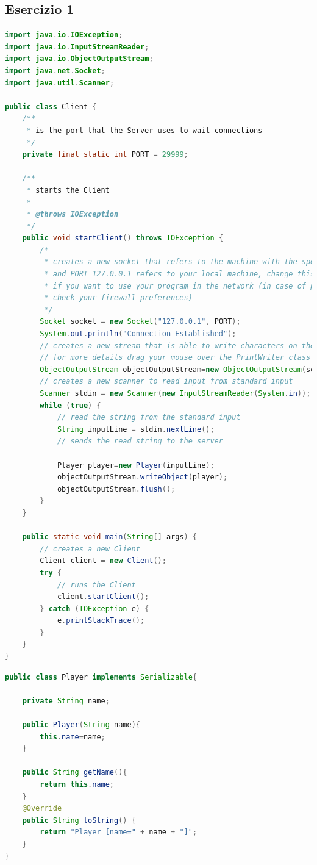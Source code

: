 \documentclass{article}
\begin{document}
\subsection{Esercizio 1}
\begin{lstlisting}[language=Java,escapechar=|]
import java.io.IOException;
import java.io.InputStreamReader;
import java.io.ObjectOutputStream;
import java.net.Socket;
import java.util.Scanner;

public class Client {
	/**
	 * is the port that the Server uses to wait connections
	 */
	private final static int PORT = 29999;

	/**
	 * starts the Client
	 *
	 * @throws IOException
	 */
	public void startClient() throws IOException {
		/*
		 * creates a new socket that refers to the machine with the specified IP
		 * and PORT 127.0.0.1 refers to your local machine, change this address
		 * if you want to use your program in the network (in case of problems
		 * check your firewall preferences)
		 */
		Socket socket = new Socket("127.0.0.1", PORT);
		System.out.println("Connection Established");
		// creates a new stream that is able to write characters on the socket
		// for more details drag your mouse over the PrintWriter class
		ObjectOutputStream objectOutputStream=new ObjectOutputStream(socket.getOutputStream());
		// creates a new scanner to read input from standard input
		Scanner stdin = new Scanner(new InputStreamReader(System.in));
		while (true) {
			// read the string from the standard input
			String inputLine = stdin.nextLine();
			// sends the read string to the server
			
			Player player=new Player(inputLine);
			objectOutputStream.writeObject(player);
			objectOutputStream.flush();
		}
	}

	public static void main(String[] args) {
		// creates a new Client
		Client client = new Client();
		try {
			// runs the Client
			client.startClient();
		} catch (IOException e) {
			e.printStackTrace();
		}
	}
}
\end{lstlisting}
\begin{lstlisting}[language=Java,escapechar=|]
public class Player implements Serializable{

	private String name;
	
	public Player(String name){
		this.name=name;
	}
	
	public String getName(){
		return this.name;
	}
	@Override
	public String toString() {
		return "Player [name=" + name + "]";
	}
}
\end{lstlisting}
\end{document}
